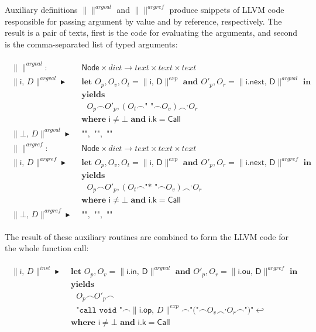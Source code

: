 \documentclass{article}
\newcommand{\trad}[2]{\ensuremath{\lVert \textsf{#1} \rVert^{\textit{#2}}}}
\newcommand{\nl}[0]{\ensuremath{\hookleftarrow}}
\DeclareMathOperator{\conc}{\smallfrown}
\DeclareMathOperator{\isdef}{\blacktriangleright}
\begin{document}
Auxiliary definitions $\trad{}{argval}$ and $\trad{}{argref}$ produce
snippets of LLVM code responsible for passing argument by value and
by reference, respectively. The result is a pair of texts, first is
the code for evaluating the arguments, and second is the comma-separated
list of typed arguments:
\begin{framed}
\begin{align}
\begin{split}
  \trad{}{argval} : & \textsf{ Node} \times dict \rightarrow text \times text \times text \\
  \trad{i, $D$}{argval} \isdef 
  & \textbf{ let } O_p, O_v, O_t = \trad{i, D}{exp} \textbf{ and } O'_p, O_r = \trad{i.next, D}{argval} \textbf{ in}  \\
  & \textbf{ yields }  \\
  & \quad O_p \conc O'_p, (O_t \conc \texttt{" "} \conc O_v) \conc^, O_r  \\
  & \textbf{ where } \textsf{i} \ne \bot \textbf{ and } \textsf{i.k} = \textsf{Call}  \\
  \trad{$\bot$, $D$}{argval} \isdef & \texttt{ ""},\texttt{ ""},\texttt{ ""}  \\
  \trad{}{argref} : & \textsf{ Node} \times dict \rightarrow text \times text \times text \\
  \trad{i, $D$}{argref} \isdef 
  & \textbf{ let } O_p, O_v, O_t = \trad{i, D}{exp} \textbf{ and } O'_p, O_r = \trad{i.next, D}{argref} \textbf{ in}  \\
  & \textbf{ yields }  \\
  & \quad O_p \conc O'_p, (O_t \conc \texttt{"* "} \conc O_v) \conc^, O_r  \\
  & \textbf{ where } \textsf{i} \ne \bot \textbf{ and } \textsf{i.k} = \textsf{Call}  \\
  \trad{$\bot$, $D$}{argref} \isdef & \texttt{ ""},\texttt{ ""},\texttt{ ""} 
\end{split}
\end{align}
\end{framed}

The result of these auxiliary routines are combined to form the LLVM code
for the whole function call:

\begin{framed}
\begin{align}
\begin{split}
  \trad{i, $D$}{inst} \isdef 
  & \textbf{ let } O_p, O_v = \trad{i.in, D}{argval} \textbf{ and } O'_p, O_r = \trad{i.ou, D}{argref} \textbf{ in} \\
  & \textbf{ yields }  \\
  & \quad O_p \conc O'_p \conc  \\
  & \quad \texttt{"call void "} \conc \trad{i.op, $D$}{exp} \conc \texttt{"("} \conc O_v \conc^, O_r \conc \texttt{")"} \nl  \\
  & \textbf{ where } \textsf{i} \ne \bot \textbf{ and } \textsf{i.k} = \textsf{Call} 
\end{split}
\end{align}
\end{framed}
\end{document}
